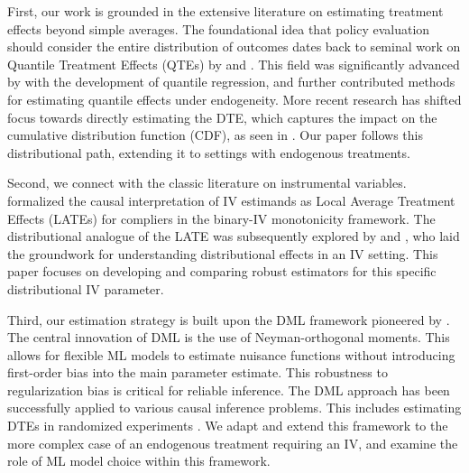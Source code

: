\documentclass[final,3p,fleqn, 10pt]{elsarticle}
\begin{document}
First, our work is grounded in the extensive literature on estimating treatment effects beyond simple averages. The foundational idea that policy evaluation should consider the entire distribution of outcomes dates back to seminal work on Quantile Treatment Effects (QTEs) by \citet{doksum1974empirical} and \citet{lehmann1975nonparametrics}. This field was significantly advanced by \citet{koenker2005quantile} with the development of quantile regression, and \citet{firpo2007efficient} further contributed methods for estimating quantile effects under endogeneity. More recent research has shifted focus towards directly estimating the DTE, which captures the impact on the cumulative distribution function (CDF), as seen in \citet{chernozhukov2013inference}. Our paper follows this distributional path, extending it to settings with endogenous treatments.

Second, we connect with the classic literature on instrumental variables. \citet{angrist1996identification} formalized the causal interpretation of IV estimands as Local Average Treatment Effects (LATEs) for compliers in the binary-IV monotonicity framework. The distributional analogue of the LATE was subsequently explored by \citet{imbens1997estimating} and \citet{abadie2002bootstrap}, who laid the groundwork for understanding distributional effects in an IV setting. This paper focuses on developing and comparing robust estimators for this specific distributional IV parameter.

Third, our estimation strategy is built upon the DML framework pioneered by \citet{chernozhukov2018debiased}. The central innovation of DML is the use of Neyman-orthogonal moments. This allows for flexible ML models to estimate nuisance functions without introducing first-order bias into the main parameter estimate. This robustness to regularization bias is critical for reliable inference. The DML approach has been successfully applied to various causal inference problems. This includes estimating DTEs in randomized experiments \citep{byambadalai24a}. We adapt and extend this framework to the more complex case of an endogenous treatment requiring an IV, and examine the role of ML model choice within this framework.
\end{document}

